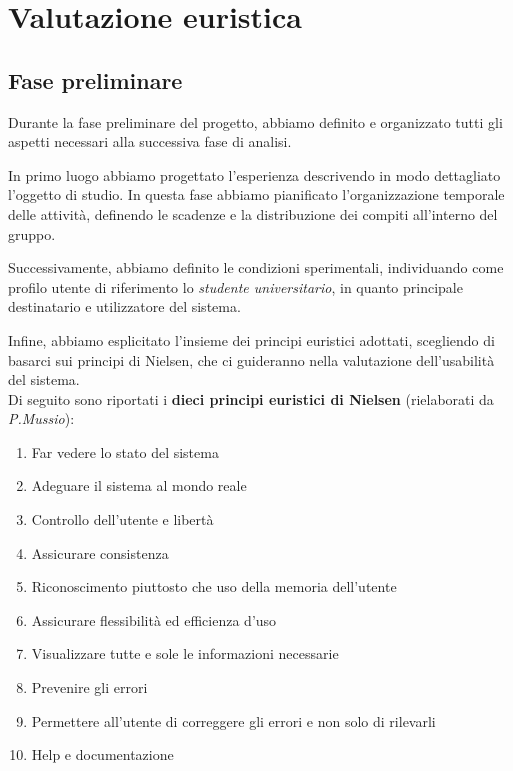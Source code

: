 \section{Valutazione euristica}
\label{subsec:valutazione_euristica}

\subsection{Fase preliminare}
Durante la fase preliminare del progetto, abbiamo definito e organizzato tutti gli aspetti necessari alla successiva fase di analisi.

In primo luogo abbiamo progettato l'esperienza descrivendo in modo dettagliato l'oggetto di studio. In questa fase abbiamo pianificato l'organizzazione temporale delle attività, definendo le scadenze e la distribuzione dei compiti all'interno del gruppo.

Successivamente, abbiamo definito le condizioni sperimentali, individuando come profilo utente di riferimento lo \textit{studente universitario}, in quanto principale destinatario e utilizzatore del sistema.

Infine, abbiamo esplicitato l'insieme dei principi euristici adottati, scegliendo di basarci sui principi di Nielsen, che ci guideranno nella valutazione dell'usabilità del sistema. \\

\noindent
Di seguito sono riportati i \textbf{dieci principi euristici di Nielsen} (rielaborati da \textit{P.Mussio}):

\begin{enumerate}
	\item Far vedere lo stato del sistema
	\item Adeguare il sistema al mondo reale
	\item Controllo dell'utente e libertà
	\item Assicurare consistenza
	\item Riconoscimento piuttosto che uso della memoria dell'utente
	\item Assicurare flessibilità ed efficienza d'uso
	\item Visualizzare tutte e sole le informazioni necessarie
	\item Prevenire gli errori
	\item Permettere all'utente di correggere gli errori e non solo di rilevarli
	\item Help e documentazione
\end{enumerate}

